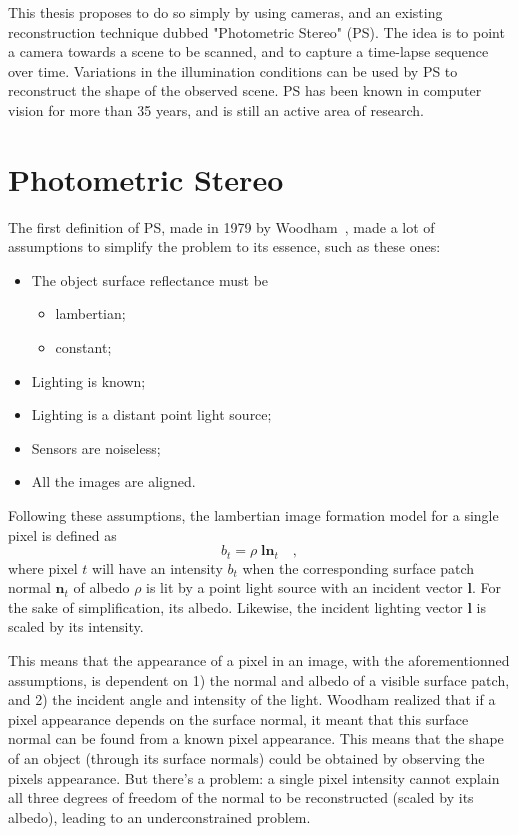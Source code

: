 \documentclass{report}
\begin{document}
This thesis proposes to do so simply by using cameras, and an existing reconstruction technique dubbed "Photometric Stereo" (PS). The idea is to point a camera towards a scene to be scanned, and to capture a time-lapse sequence over time. Variations in the illumination conditions can be used by PS to reconstruct the shape of the observed scene. PS has been known in computer vision for more than 35 years, and is still an active area of research.

\section{Photometric Stereo}

The first definition of PS, made in 1979 by Woodham~\cite{Woodham1979}, made a lot of assumptions to simplify the problem to its essence, such as these ones:

\begin{itemize} \setlength\itemsep{-0.2em}
  \item The object surface reflectance must be
  \vspace{-0.65em}\begin{itemize} \setlength\itemsep{0.1em}
    \item lambertian;
    \item constant;
  \end{itemize} \vspace{-0.4em}
  \item Lighting is known;
  \item Lighting is a distant point light source;
  \item Sensors are noiseless;
  \item All the images are aligned.
\end{itemize}

Following these assumptions, the lambertian image formation model for a single pixel is defined as
\begin{equation}
b_t =  \rho \; \mathbf{l} \mathbf{n}_t \quad,
\end{equation}
where pixel $t$ will have an intensity $b_t$ when the corresponding surface patch normal $\mathbf{n}_t$ of albedo $\rho$ is lit by a point light source with an incident vector $\mathbf{l}$. For the sake of simplification, its albedo. Likewise, the incident lighting vector $\mathbf{l}$ is scaled by its intensity.

This means that the appearance of a pixel in an image, with the aforementionned assumptions, is dependent on 1) the normal and albedo of a visible surface patch, and 2) the incident angle and intensity of the light. Woodham realized that if a pixel appearance depends on the surface normal, it meant that this surface normal can be found from a known pixel appearance. This means that the shape of an object (through its surface normals) could be obtained by observing the pixels appearance. But there's a problem: a single pixel intensity cannot explain all three degrees of freedom of the normal to be reconstructed (scaled by its albedo), leading to an underconstrained problem.
\end{document}
